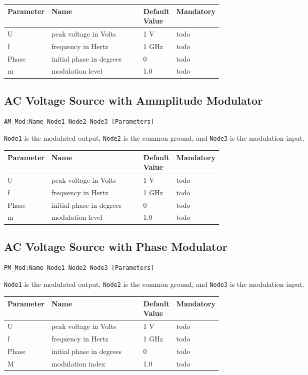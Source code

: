 \begin{tabular}{|l|p{0.5\linewidth}|l|l|}
\hline
Parameter & Name & Default Value & Mandatory \\
\hline
U & peak voltage in Volts & 1 V & todo \\
f & frequency in Hertz & 1 GHz & todo \\
Phase & initial phase in degrees & 0 & todo \\
m & modulation level & 1.0 & todo \\
\hline
\end{tabular}



\subsection{AC Voltage Source with Ammplitude Modulator}

\begin{verbatim}
AM_Mod:Name Node1 Node2 Node3 [Parameters]
\end{verbatim}

\verb+Node1+ is the modulated output, \verb+Node2+ is the common ground, and \verb+Node3+ is the modulation input.

\begin{tabular}{|l|p{0.5\linewidth}|l|l|}
\hline
Parameter & Name & Default Value & Mandatory \\
\hline
U & peak voltage in Volts & 1 V & todo \\
f & frequency in Hertz & 1 GHz & todo \\
Phase & initial phase in degrees & 0 & todo \\
m & modulation level & 1.0 & todo \\
\hline
\end{tabular}



\subsection{AC Voltage Source with Phase Modulator}

\begin{verbatim}
PM_Mod:Name Node1 Node2 Node3 [Parameters]
\end{verbatim}

\verb+Node1+ is the modulated output, \verb+Node2+ is the common ground, and \verb+Node3+ is the modulation input.

\begin{tabular}{|l|p{0.5\linewidth}|l|l|}
\hline
Parameter & Name & Default Value & Mandatory \\
\hline
U & peak voltage in Volts & 1 V & todo \\
f & frequency in Hertz & 1 GHz & todo \\
Phase & initial phase in degrees & 0 & todo \\
M & modulation index & 1.0 & todo \\
\hline
\end{tabular}



